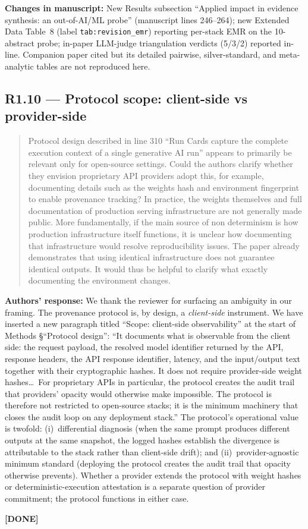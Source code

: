\documentclass[11pt,a4paper]{article}
\newenvironment{revquote}{%
  \begin{quote}\small\itshape\color{revgray}
}{%
  \end{quote}
}
\newcommand{\response}[1]{\par\noindent\textbf{\color{revgreen}Authors' response:} #1\par}
\newcommand{\changes}[1]{\par\noindent\textbf{\color{revblue}Changes in manuscript:} #1\par}
\newcommand{\done}{\color{revgreen}\textbf{[DONE]}}
\begin{document}
\changes{New Results subsection ``Applied impact in evidence synthesis: an out-of-AI/ML probe'' (manuscript lines 246--264); new Extended Data Table~8 (label \texttt{tab:revision\_emr}) reporting per-stack EMR on the 10-abstract probe; in-paper LLM-judge triangulation verdicts (5/3/2) reported in-line. Companion paper cited but its detailed pairwise, silver-standard, and meta-analytic tables are not reproduced here.}

\subsection*{R1.10 --- Protocol scope: client-side vs provider-side}

\begin{revquote}
Protocol design described in line 310 ``Run Cards capture the complete execution context of a single generative AI run'' appears to primarily be relevant only for open-source settings. Could the authors clarify whether they envision proprietary API providers adopt this, for example, documenting details such as the weights hash and environment fingerprint to enable provenance tracking? In practice, the weights themselves and full documentation of production serving infrastructure are not generally made public. More fundamentally, if the main source of non determinism is how production infrastructure itself functions, it is unclear how documenting that infrastructure would resolve reproducibility issues. The paper already demonstrates that using identical infrastructure does not guarantee identical outputs. It would thus be helpful to clarify what exactly documenting the environment changes.
\end{revquote}

\response{We thank the reviewer for surfacing an ambiguity in our framing. The provenance protocol is, by design, a \emph{client-side} instrument. We have inserted a new paragraph titled ``Scope: client-side observability'' at the start of Methods §``Protocol design'': ``It documents what is observable from the client side: the request payload, the resolved model identifier returned by the API, response headers, the API response identifier, latency, and the input/output text together with their cryptographic hashes. It does not require provider-side weight hashes\ldots\ For proprietary APIs in particular, the protocol creates the audit trail that providers' opacity would otherwise make impossible. The protocol is therefore not restricted to open-source stacks; it is the minimum machinery that closes the audit loop on any deployment stack.'' The protocol's operational value is twofold: (i)~differential diagnosis (when the same prompt produces different outputs at the same snapshot, the logged hashes establish the divergence is attributable to the stack rather than client-side drift); and (ii)~provider-agnostic minimum standard (deploying the protocol creates the audit trail that opacity otherwise prevents). Whether a provider extends the protocol with weight hashes or deterministic-execution attestation is a separate question of provider commitment; the protocol functions in either case.} \done
\end{document}
